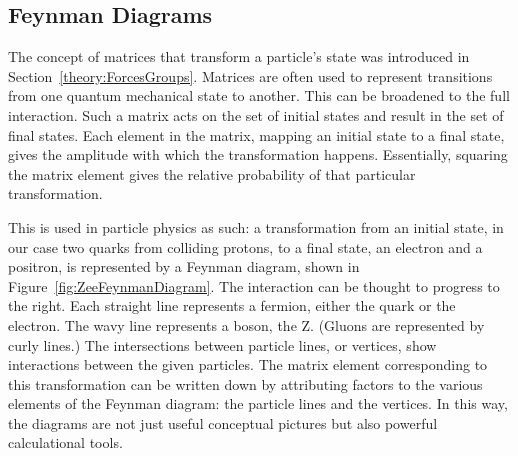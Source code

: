 \subsection{Feynman Diagrams}
\label{theory:feynman}

The concept of matrices that 
transform a particle's state 
was introduced in Section~\ref{theory:ForcesGroups}. 
Matrices are often used to represent transitions 
from one quantum mechanical state to another.  
This can be broadened to the full interaction.  
Such a matrix acts on the set of initial states 
and result in the set of final states.  
Each element in the matrix, mapping an initial state 
to a final state, 
gives the amplitude with which the %
transformation happens.  
Essentially, squaring the matrix element gives the 
relative probability of that particular transformation.  

This is used in particle physics as such: 
a transformation from an initial state, 
in our case two quarks from colliding protons, 
to a final state, 
an electron and a positron, 
is represented by a Feynman diagram, 
shown in Figure~\ref{fig:ZeeFeynmanDiagram}.  
The interaction can be thought to progress to the right.  
Each straight line represents a fermion, 
either the quark or the electron.  
The wavy line represents a boson, the Z.  
(Gluons are represented by curly lines.)  
The intersections between particle lines, or vertices, 
show interactions between the given particles.  
The matrix element corresponding to this transformation 
can be written down 
by attributing factors to the various elements 
of the Feynman diagram: 
the particle lines and the vertices.  
In this way, the diagrams are not just useful 
conceptual pictures 
but also powerful calculational tools.  


